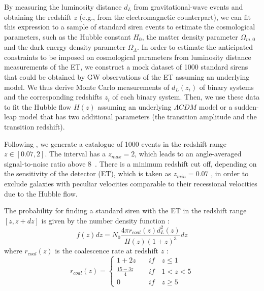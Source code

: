\documentclass[universe,article,accept,moreauthors,pdftex]{Definitions/mdpi}
\begin{document}
By measuring the luminosity distance $d_L$ from gravitational-wave events and obtaining the redshift $z$ (e.g., from the electromagnetic counterpart), we can fit this expression to a sample of standard siren events to estimate the cosmological parameters, such as the Hubble constant $H_0$, the matter density parameter $\Omega_{m,0}$ and the dark energy density parameter $\Omega_\Lambda$.
\newpage
In order to estimate the anticipated constraints to be imposed on cosmological parameters from luminosity distance measurements of the ET,
we construct a mock dataset of 1000 standard sirens that could be obtained by GW observations of the ET \cite{Belgacem_2018} assuming an underlying \plcdm model. We thus derive Monte Carlo measurements of $d_{L}(z_{i})$ of  binary systems and the corresponding redshifts $z_{i}$ of each binary system. Then, we use these data to fit the Hubble flow $H(z)$ assuming an underlying $\Lambda CDM$ model or a sudden-leap model that has two additional parameters (the transition amplitude and the transition redshift). 

Following \cite{Belgacem_2018}, we generate a catalogue of 1000 events in the redshift range $z \in [0.07,2]$. The interval has a $z_{max}=2$, which leads to an angle-averaged signal-to-noise ratio above \mbox{8 \cite{Belgacem_2018,Zhao_2011}}. There is a minimum redshift cut off, depending on the sensitivity of the detector (ET), which is taken as $z_{min}=0.07$ \cite{Belgacem_2018}, in order to exclude galaxies with peculiar velocities  comparable to their recessional velocities due to the Hubble flow. 



 The probability for finding a standard siren with the ET in the redshift range $[z,z+dz]$ is given by the number density function \cite{Belgacem_2018,Zhao_2011}: 
 \begin{equation}
 f(z) dz=N_{0} \frac{4 \pi r_{coal}(z) d_{L}^{2}(z)}{H(z)(1+z)^{3}} dz
 \label{fofz}
 \end{equation}
where $r_{coal}(z)$ is the coalescence rate at redshift $z$ \cite{Zhao_2011}:
 \begin{equation} 
 r_{coal}(z) =
  \begin{cases}
    1+2z      & \quad if \quad z\leq 1 \\
    \frac{15-3z}{4}  & \quad if \quad 1<z<5\\
    0 & \quad if \quad z\geq 5 
  \end{cases}
  \end{equation}
\end{document}
